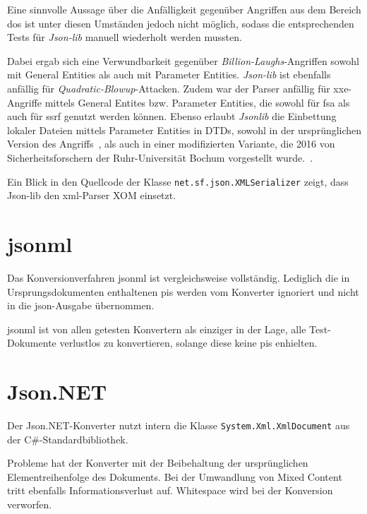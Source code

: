 Eine sinnvolle Aussage über die Anfälligkeit gegenüber Angriffen aus dem Bereich \acrlong{dos} ist unter diesen Umständen jedoch nicht möglich, sodass die entsprechenden Tests für \emph{Json-lib} manuell wiederholt werden mussten.

Dabei ergab sich eine Verwundbarkeit gegenüber \emph{Billion-Laughs}-Angriffen sowohl mit General Entities als auch mit Parameter Entities. \emph{Json-lib} ist ebenfalls anfällig für \emph{Quadratic\hyp{}Blowup}\hyp{}Attacken. Zudem war der Parser anfällig für \acrshort{xxe}-Angriffe mittels General Entites bzw. Parameter Entities, die sowohl für \acrlong{fsa} als auch für \acrlong{ssrf} genutzt werden können.
Ebenso erlaubt \emph{Jsonlib} die Einbettung lokaler Dateien mittels Parameter Entities in DTDs, sowohl in der ursprünglichen Version des Angriffs~\cite[S.~10]{morgan2014xml}, als auch in einer modifizierten Variante, die 2016 von Sicherheitsforschern der Ruhr-Universität Bochum vorgestellt wurde.~\cite[Abschn.~5.2]{spaeth2016sok}.

Ein Blick in den Quellcode der Klasse \texttt{net.sf.json.XMLSerializer} zeigt, dass Json-lib den \acrshort{xml}-Parser XOM einsetzt.

\section{\acrshort{jsonml}}
\label{sec:jsonml}

Das Konversionverfahren \acrshort{jsonml} ist vergleichsweise vollständig. Lediglich die in Ursprungsdokumenten enthaltenen \glspl{pi} werden vom Konverter ignoriert und nicht in die \acrshort{json}-Ausgabe übernommen.

\acrshort{jsonml} ist von allen getesten Konvertern als einziger in der Lage, alle Test-Dokumente verlustlos zu konvertieren, solange diese keine \glspl{pi} enhielten.

\section{Json.NET}
\label{sec:jsondotnet}

Der Json.NET-Konverter nutzt intern die Klasse \texttt{System.Xml.XmlDocument} aus der C\#\hyp{}Standardbibliothek.

Probleme hat der Konverter mit der Beibehaltung der ursprünglichen Elementreihenfolge des Dokuments. Bei der Umwandlung von Mixed Content tritt ebenfalls Informationsverlust auf. Whitespace wird bei der Konversion verworfen.

